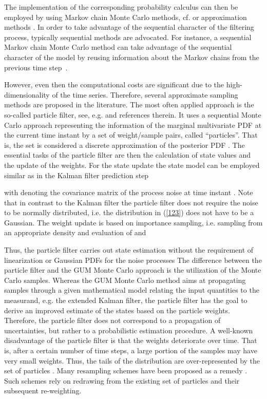 \documentclass[10pt]{article}
\begin{document}
\begin{spacing}{1}
The implementation of the corresponding probability calculus can then be employed by using Markov chain Monte Carlo methods, cf. \cite{Klauenberg:2016dw, Hoffman:2011} or approximation methods \cite{Jiang:2010wg}. In order to take advantage of the sequential character of the filtering process, typically sequential methods are advocated.
For instance, a sequential Markov chain Monte Carlo method can take advantage of the sequential character of the model by reusing information about the Markov chains from the previous time step~\cite{Yang2013}.

However, even then the computational costs are significant due to the high-dimensionality of the time series. Therefore, several approximate sampling methods are proposed in the literature. The most often applied approach is the so-called particle filter, see, e.g. \cite{Garcia:2013kq, Candy, Wang:2007ik} and references therein. It uses a sequential Monte Carlo approach representing the information of the marginal multivariate PDF at the current time instant by a set of weight/sample pairs, called ``particles''. That is, the set  is considered a discrete approximation of the posterior PDF . The essential tasks of the particle filter are then the calculation of state values  and the update of the weights. For the state update the state model can be employed similar as in the Kalman filter prediction step

with  denoting the covariance matrix of the process noise at time instant . Note that in contrast to the Kalman filter the particle filter does not require the noise to be normally distributed, i.e. the distribution  in (\ref{123}) does not have to be a Gaussian.
The weight update is based on importance sampling, i.e. sampling from an appropriate density  and evaluation of  and 

Thus, the particle filter carries out state estimation without the requirement of linearization or Gaussian PDFs for the noise processes The difference between the particle filter and the GUM Monte Carlo approach is the utilization of the Monte Carlo samples. Whereas the GUM Monte Carlo method aims at propagating samples through a given mathematical model relating the input quantities to the measurand, e.g. the extended Kalman filter, the particle filter has the goal to derive an improved estimate of the states based on the particle weights. Therefore, the particle filter does not correspond to a propagation of uncertainties, but rather to a probabilistic estimation procedure. 
A well-known disadvantage of the particle filter is that the weights deteriorate over time. That is, after a certain number of time steps, a large portion of the samples may have very small weights. Thus, the tails of the distribution are over-represented by the set of particles \cite{Candy}. Many resampling schemes have been proposed as a remedy \cite{Douc:2005}. Such schemes rely on redrawing from the existing set of particles and their subsequent re-weighting. 


\end{spacing}
\end{document}

